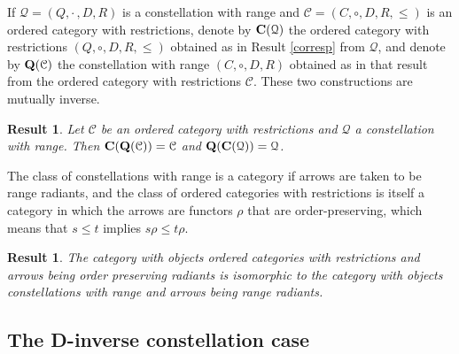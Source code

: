 \documentclass[12pt]{amsart}
\newtheorem{result}[thm]{Result}
\theoremstyle{definition}
\newcommand{\mc}{\mathcal}
\newcommand{\Q}{\mathcal Q}
\newcommand{\C}{\mathcal C}
\begin{document}
If $\Q=(Q,\cdot\, ,D,R)$ is a constellation with range and $\C=(C,\circ ,D,R,\leq)$ is an ordered category with restrictions, denote by ${\bf C}(\Q)$ the ordered category with restrictions $(Q,\circ,D,R,\leq)$ obtained as in Result \ref{corresp} from $\Q$, and denote by ${\bf Q}(\C)$ the constellation with range $(C,\circ,D,R)$ obtained as in that result from the ordered category with restrictions ${\mc C}$.  These two constructions are mutually inverse.

\begin{result}  \label{1to1}
Let ${\mc C}$ be an ordered category with restrictions and ${\mc Q}$ a constellation with range.  Then 
${\bf C}({\bf Q}({\mc C}))={\mc C}$ and ${\bf Q}({\bf C}({\mc Q}))={\mc Q}$.
\end{result}

The class of constellations with range is a category if arrows are taken to be range radiants, and the class of ordered categories with restrictions is itself a category in which the arrows are functors $\rho$ that are order-preserving, which means that $s\leq t$ implies $s\rho\leq t\rho$. 

\begin{result}  \label{equiv}
The category with objects ordered categories with restrictions and arrows being order preserving radiants is isomorphic to the category with objects  constellations with range and  arrows being range radiants.
\end{result}

\subsection{The D-inverse constellation case}
\end{document}

